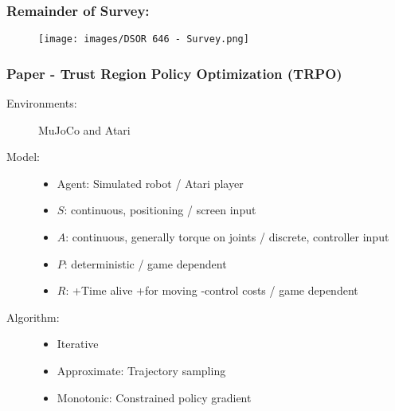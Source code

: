 \documentclass{beamer}
\begin{document}

\begin{frame}
    \frametitle{Remainder of Survey:}
    \begin{figure}\small
        \texttt{[image: images/DSOR 646 - Survey.png]}
    \end{figure}
\end{frame}

\begin{frame} %
    \frametitle{Paper \thepapercounter - Trust Region Policy Optimization (TRPO)%
    }
    \begin{description}
        \item[Environments:] MuJoCo and Atari
        \item[Model:]
        \begin{itemize}
            \item Agent: Simulated robot / Atari player
            \item $S$: continuous, positioning / screen input
            \item $A$: continuous, generally torque on joints / discrete, controller input
            \item $P$: deterministic / game dependent
            \item $R$: +Time alive +for moving -control costs / game dependent
        \end{itemize}
        \item[Algorithm:]
        \begin{itemize}
            \item Iterative
            \item Approximate: Trajectory sampling
            \item Monotonic: Constrained policy gradient
        \end{itemize}
    \end{description}
\end{frame}
\end{document}
